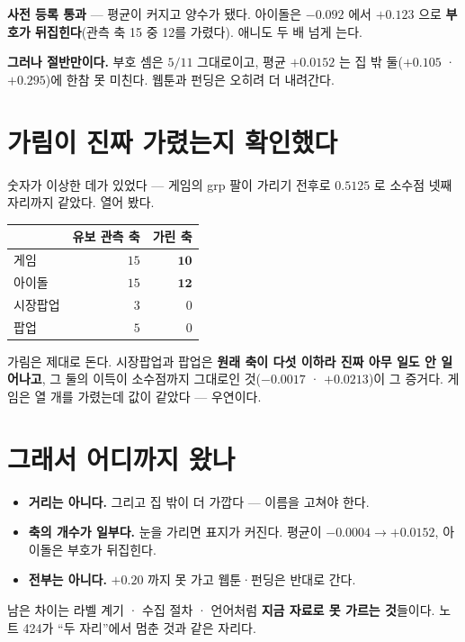 \documentclass[11pt]{article}
\begin{document}
\textbf{사전 등록 통과} --- 평균이 커지고 양수가 됐다. 아이돌은 $-0.092$ 에서
$+0.123$ 으로 \textbf{부호가 뒤집힌다}(관측 축 15 중 12를 가렸다). 애니도
두 배 넘게 는다.

\textbf{그러나 절반만이다.} 부호 셈은 $5/11$ 그대로이고, 평균 $+0.0152$ 는
집 밖 둘($+0.105$ · $+0.295$)에 한참 못 미친다. 웹툰과 펀딩은 오히려 더
내려간다.

\section{가림이 진짜 가렸는지 확인했다}

숫자가 이상한 데가 있었다 --- 게임의 grp 팔이 가리기 전후로 $0.5125$ 로
소수점 넷째 자리까지 같았다. 열어 봤다.

\begin{center}
\begin{tabular}{lrr}
\hline
 & 유보 관측 축 & 가린 축 \\
\hline
게임 & $15$ & $\mathbf{10}$ \\
아이돌 & $15$ & $\mathbf{12}$ \\
시장팝업 & $3$ & $0$ \\
팝업 & $5$ & $0$ \\
\hline
\end{tabular}
\end{center}

가림은 제대로 돈다. 시장팝업과 팝업은 \textbf{원래 축이 다섯 이하라 진짜
아무 일도 안 일어나고}, 그 둘의 이득이 소수점까지 그대로인 것($-0.0017$ ·
$+0.0213$)이 그 증거다. 게임은 열 개를 가렸는데 값이 같았다 --- 우연이다.

\section{그래서 어디까지 왔나}

\begin{itemize}
\item \textbf{거리는 아니다.} 그리고 집 밖이 더 가깝다 --- 이름을 고쳐야 한다.
\item \textbf{축의 개수가 일부다.} 눈을 가리면 표지가 커진다. 평균이
$-0.0004 \to +0.0152$, 아이돌은 부호가 뒤집힌다.
\item \textbf{전부는 아니다.} $+0.20$ 까지 못 가고 웹툰·펀딩은 반대로 간다.
\end{itemize}

남은 차이는 라벨 계기 · 수집 절차 · 언어처럼 \textbf{지금 자료로 못 가르는
것}들이다. 노트 424가 ``두 자리''에서 멈춘 것과 같은 자리다.
\end{document}

